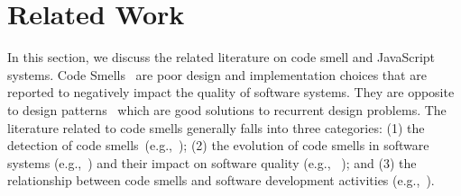 \section{Related Work}\label{sec:related}
In this section, we discuss the related literature on code smell and JavaScript systems.
Code Smells~\cite{fowler1997refactoring} are poor design and implementation choices that are reported to negatively impact the quality of software systems. They are opposite to design patterns~\cite{Gam95} which are good solutions to recurrent design problems.
The literature related to code smells generally falls into three categories: (1) the detection of code smells~(e.g.,~\cite{Khomh11-BGB,fard2013jsnose}); (2) the evolution of code smells in software systems (e.g.,~\cite{chatzigeorgiou2010investigating,CodeSmells_overtime,peters2012evaluating,tufano2015and}) and their impact on software quality (e.g., ~\cite{shatnawi2006investigation,khomh2012exploratory,Abbes11,jaafar2013mining,tufano2015and});
and (3) the relationship between code smells and software development activities (e.g.,~\cite{Sjoberg13QEC,Abbes11}).


